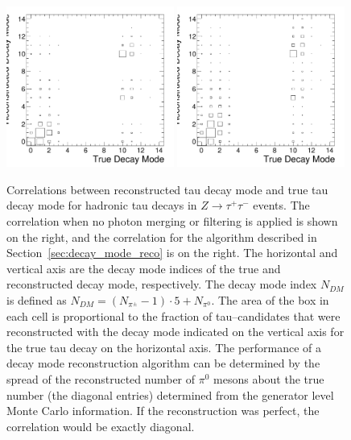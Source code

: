 \begin{figure}[thbp]
  \centering
   \includegraphics*[width=0.49\textwidth]{tanc_chapter/figures/decayModeMergerAndFilter/dmResolutionStandard.pdf}
   \includegraphics*[width=0.49\textwidth]{tanc_chapter/figures/decayModeMergerAndFilter/dmResolutionNoNothing.pdf}
   \caption[Tau decay mode reconstruction performance]{Correlations between
   reconstructed tau decay mode and true tau decay mode for hadronic tau decays
   in $Z \rightarrow \tau^{+}\tau^{-}$ events.  The correlation when no photon
   merging or filtering is applied is shown on the right, and the correlation
   for the algorithm described in Section~\ref{sec:decay_mode_reco} is on the
   right.  The horizontal and vertical axis are the decay mode indices of the
   true and reconstructed decay mode, respectively.  The decay mode index
   $N_{DM}$ is defined as $N_{DM} = (N_{\pi^{\pm}} - 1)\cdot5 + N_{\pi^0}$.  The
   area of the box in each cell is proportional to the fraction of
   tau--candidates that were reconstructed with the decay mode indicated on the
   vertical axis for the true tau decay on the horizontal axis.  The performance
   of a decay mode reconstruction algorithm can be determined by the spread of
   the reconstructed number of $\pi^0$ mesons about the true number (the
   diagonal entries) determined from the generator level Monte Carlo
   information.  If the reconstruction was perfect, the correlation would be
   exactly diagonal.
   } \label{fig:dmResolution}
\end{figure}

